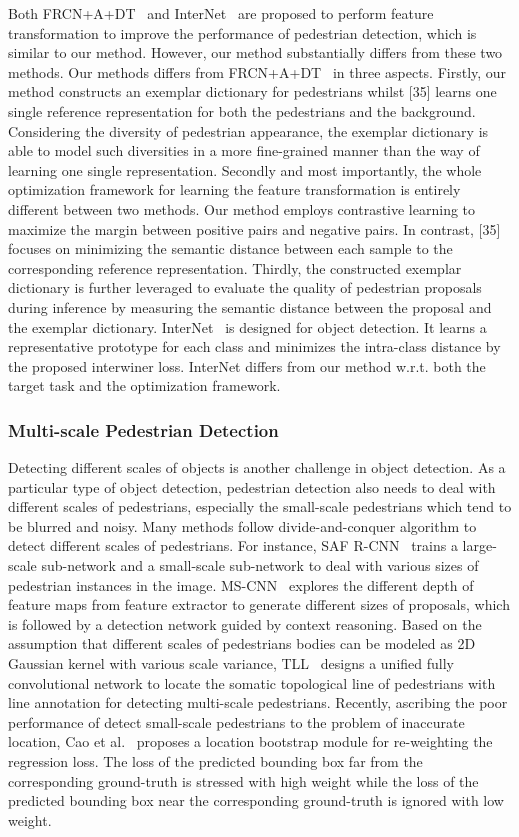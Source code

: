 \documentclass[journal]{IEEEtran}
\begin{document}
Both FRCN+A+DT~\cite{zhou2019discriminative} and InterNet~\cite{li2019feature} are proposed to perform feature transformation to improve the performance of pedestrian detection, which is similar to our method. However, our method substantially differs from these two methods.
Our methods differs from FRCN+A+DT~\cite{zhou2019discriminative} in three aspects. Firstly, our method constructs an exemplar dictionary for pedestrians whilst [35] learns one single reference representation for both the pedestrians and the background. Considering the diversity of pedestrian appearance, the exemplar dictionary is able to model such diversities in a more fine-grained manner than the way of learning one single representation. Secondly and most importantly, the whole optimization framework for learning the feature transformation is entirely different between two methods. Our method employs contrastive learning to maximize the margin between positive pairs and negative pairs. In contrast, [35] focuses on minimizing the semantic distance between each sample to the corresponding reference representation. Thirdly, the constructed exemplar dictionary is further leveraged to evaluate the quality of pedestrian proposals during inference by measuring the semantic distance between the proposal and the exemplar dictionary. InterNet~\cite{li2019feature} is designed for object detection. It learns a representative prototype for each class and minimizes the intra-class distance by the proposed interwiner loss. InterNet differs from our method w.r.t. both the target task and the optimization framework.

\subsubsection{Multi-scale Pedestrian Detection}
Detecting different scales of objects is another challenge in object detection. As a particular type of object detection, pedestrian detection also needs to deal with different scales of pedestrians, especially the small-scale pedestrians which tend to be blurred and noisy. Many methods follow divide-and-conquer algorithm to detect different scales of pedestrians. For instance, SAF R-CNN~\cite{li2017scale} trains a large-scale sub-network and a small-scale sub-network to deal with various sizes of pedestrian instances in the image. MS-CNN~\cite{cai2016unified} explores the different depth of feature maps from feature extractor to generate different sizes of proposals, which is followed by a detection network guided by context reasoning. Based on the assumption that different scales of pedestrians bodies can be modeled as 2D Gaussian kernel with various scale variance, TLL~\cite{song2018small} designs a unified fully convolutional network to locate the somatic topological line of pedestrians with line annotation for detecting multi-scale pedestrians. Recently, ascribing the poor performance of detect small-scale pedestrians to the problem of inaccurate location, Cao et al.~\cite{cao2019taking} proposes a location bootstrap module for re-weighting the regression loss. The loss of the predicted bounding box far from the corresponding ground-truth is stressed with high weight while the loss of the predicted bounding box near the corresponding ground-truth is ignored with low weight.
\end{document}
